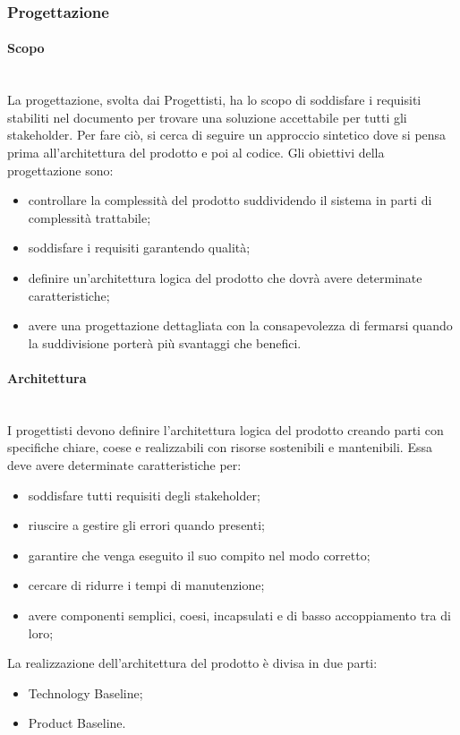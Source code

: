\subsubsection{Progettazione}
\paragraph{Scopo}\mbox{}\\
La progettazione, svolta dai Progettisti, ha lo scopo di soddisfare i requisiti stabiliti nel documento \AdR{} per trovare una soluzione accettabile per tutti gli stakeholder.
Per fare ciò, si cerca di seguire un approccio sintetico dove si pensa prima all’architettura del prodotto e poi al codice.
Gli obiettivi della progettazione sono:
\begin{itemize}
	\item controllare la complessità del prodotto suddividendo il sistema in parti di complessità trattabile;
	\item soddisfare i requisiti garantendo qualità;
	\item definire un’architettura logica del prodotto che dovrà avere determinate caratteristiche;
	\item avere una progettazione dettagliata con la consapevolezza di fermarsi quando la suddivisione porterà più svantaggi che benefici.
\end{itemize}

\paragraph{Architettura}\mbox{}\\
I progettisti devono definire l’architettura logica del prodotto creando parti con specifiche chiare, coese e realizzabili con risorse sostenibili e mantenibili. Essa deve avere determinate caratteristiche per:
\begin{itemize}
	\item soddisfare tutti requisiti degli stakeholder;
	\item riuscire a gestire gli errori quando presenti;
	\item garantire che venga eseguito il suo compito nel modo corretto;
	\item cercare di ridurre i tempi di manutenzione;
	\item avere componenti semplici, coesi, incapsulati e di basso accoppiamento tra di loro;
\end{itemize}

La realizzazione dell’architettura del prodotto è divisa in due parti:
\begin{itemize}
	\item Technology Baseline;
	\item Product Baseline.
\end{itemize}

